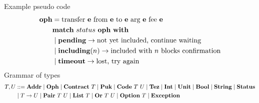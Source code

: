 \documentclass[a4paper]{llncs}
\begin{document}
Example pseudo code
\begin{align*}
  \OPH &=  \TRANSFER[\EXPR]\EXPR\EXPR\EXPR\EXPR \\
       & \MATCH\ {status\ \OPH}\ \WITH \\
       & \mid \STATUSPENDING \to \textrm{not yet included, continue waiting} \\
       & \mid \STATUSINCLUDING (n) \to \textrm{included with $n$
         blocks confirmation}\\
       & \mid \STATUSTIMEOUT \to \textrm{lost, try again}
\end{align*}
Grammar of types
\begin{align*}
  \TYPE, \TYPEU & ::= \TADDR \mid \TOPH \mid
                  \TCONTRACT\ \TYPE \mid
                  \TPUK \mid
                  \TCODE\ \TYPE\ \TYPEU \mid \TTEZ \mid
          \TINT \mid \TUNIT \mid \TBOOL \mid \TSTRING \mid \TSTATUS \\
  & \mid \TYPE\to\TYPEU \mid \TPAIR\ \TYPE\ \TYPEU \mid \TLIST\ \TYPE
    \mid \TSUM\ \TYPE\ \TYPEU \mid \TOPTION\ \TYPE \mid \TEXCEPTION
\end{align*}
\end{document}
